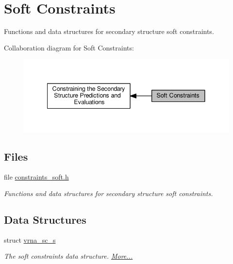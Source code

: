 \hypertarget{group__soft__constraints}{}\section{Soft Constraints}
\label{group__soft__constraints}


Functions and data structures for secondary structure soft constraints.  


Collaboration diagram for Soft Constraints\+:
\nopagebreak
\begin{figure}[H]
\begin{center}
\leavevmode
\includegraphics[width=341pt]{group__soft__constraints}
\end{center}
\end{figure}
\subsection*{Files}
\begin{DoxyCompactItemize}
\item 
file \hyperlink{constraints__soft_8h}{constraints\+\_\+soft.\+h}
\begin{DoxyCompactList}\small\item\em Functions and data structures for secondary structure soft constraints. \end{DoxyCompactList}\end{DoxyCompactItemize}
\subsection*{Data Structures}
\begin{DoxyCompactItemize}
\item 
struct \hyperlink{group__soft__constraints_structvrna__sc__s}{vrna\+\_\+sc\+\_\+s}
\begin{DoxyCompactList}\small\item\em The soft constraints data structure.  \hyperlink{group__soft__constraints_structvrna__sc__s}{More...}\end{DoxyCompactList}\end{DoxyCompactItemize}
